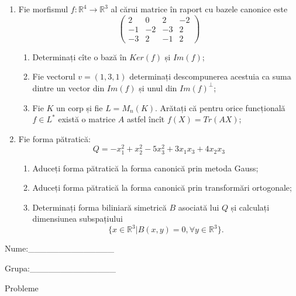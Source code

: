 \documentclass{article}
\begin{document}
\begin{enumerate}
 \item Fie morfismul $f:\mathbb{R}^4 \to \mathbb{R}^3$ al cărui matrice în raport cu bazele canonice este
$$\begin{pmatrix}
2&0&2&-2\\
-1&-2&-3&2\\
-3&2&-1&2
\end{pmatrix}$$

\begin{enumerate}
\item Determinați cîte o bază în $Ker(f)$ și $Im(f)$;
\item Fie vectorul $v=(1,3,1)$ determinați descompunerea acestuia ca suma dintre un vector din $Im(f)$ și unul din $Im(f)^\perp$;
\item Fie $K$ un corp și fie $L=M_n(K)$. Arătați că pentru orice funcțională $f \in L^*$ există o matrice $A$ astfel încît $f(X)=Tr(AX)$;
\end{enumerate}
\item Fie forma pătratică:
$$Q= -x_1^2+x_2^2-5x_3^2+3x_1x_3+4x_2x_3$$

\begin{enumerate}
\item Aduceți forma pătratică la forma canonică prin metoda Gauss;
\item Aduceți forma pătratică la forma canonică prin transformări ortogonale;
\item Determinați forma biliniară simetrică $B$ asociată lui $Q$ și calculați dimensiunea subspațiului
$$\{x \in \mathbb{R}^3 | B(x,y)=0,\forall y \in \mathbb{R}^3\}.$$

\end{enumerate}
\end{enumerate}
\newpage
\begin{flushright}
Nume:\_\_\_\_\_\_\_\_\_\_\_\_\_\_
 
 
Grupa:\_\_\_\_\_\_\_\_\_\_\_\_\_\_
\end{flushright}
\begin{center}
\vspace{2cm}
{\Large Probleme}
\vspace{2cm}
\end{center}
\end{document}
